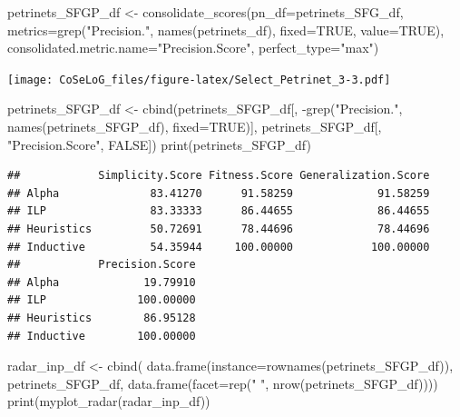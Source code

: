 \documentclass[]{article}
\newenvironment{Shaded}{\begin{snugshade}}{\end{snugshade}}
\newcommand{\KeywordTok}[1]{\textcolor[rgb]{0.94,0.87,0.69}{{#1}}}
\newcommand{\DataTypeTok}[1]{\textcolor[rgb]{0.87,0.87,0.75}{{#1}}}
\newcommand{\StringTok}[1]{\textcolor[rgb]{0.80,0.58,0.58}{{#1}}}
\newcommand{\OtherTok}[1]{\textcolor[rgb]{0.94,0.94,0.56}{{#1}}}
\newcommand{\NormalTok}[1]{\textcolor[rgb]{0.80,0.80,0.80}{{#1}}}
\begin{document}
\begin{Shaded}
\begin{Highlighting}[]
\NormalTok{petrinets_SFGP_df <-}\StringTok{ }\KeywordTok{consolidate_scores}\NormalTok{(}\DataTypeTok{pn_df=}\NormalTok{petrinets_SFG_df, }
        \DataTypeTok{metrics=}\KeywordTok{grep}\NormalTok{(}\StringTok{"Precision."}\NormalTok{, }\KeywordTok{names}\NormalTok{(petrinets_df), }\DataTypeTok{fixed=}\OtherTok{TRUE}\NormalTok{, }\DataTypeTok{value=}\OtherTok{TRUE}\NormalTok{), }
        \DataTypeTok{consolidated.metric.name=}\StringTok{"Precision.Score"}\NormalTok{,}
        \DataTypeTok{perfect_type=}\StringTok{"max"}\NormalTok{)}
\end{Highlighting}
\end{Shaded}

\texttt{[image: CoSeLoG\_files/figure-latex/Select\_Petrinet\_3-3.pdf]}

\begin{Shaded}
\begin{Highlighting}[]
\NormalTok{petrinets_SFGP_df <-}\StringTok{ }\KeywordTok{cbind}\NormalTok{(petrinets_SFGP_df[, }
            \NormalTok{-}\KeywordTok{grep}\NormalTok{(}\StringTok{"Precision."}\NormalTok{, }\KeywordTok{names}\NormalTok{(petrinets_SFGP_df), }\DataTypeTok{fixed=}\OtherTok{TRUE}\NormalTok{)],}
            \NormalTok{petrinets_SFGP_df[, }\StringTok{"Precision.Score"}\NormalTok{, }\OtherTok{FALSE}\NormalTok{])}
\KeywordTok{print}\NormalTok{(petrinets_SFGP_df)}
\end{Highlighting}
\end{Shaded}

\begin{verbatim}
##            Simplicity.Score Fitness.Score Generalization.Score
## Alpha              83.41270      91.58259             91.58259
## ILP                83.33333      86.44655             86.44655
## Heuristics         50.72691      78.44696             78.44696
## Inductive          54.35944     100.00000            100.00000
##            Precision.Score
## Alpha             19.79910
## ILP              100.00000
## Heuristics        86.95128
## Inductive        100.00000
\end{verbatim}

\begin{Shaded}
\begin{Highlighting}[]
\NormalTok{radar_inp_df <-}\StringTok{ }\KeywordTok{cbind}\NormalTok{( }\KeywordTok{data.frame}\NormalTok{(}\DataTypeTok{instance=}\KeywordTok{rownames}\NormalTok{(petrinets_SFGP_df)),}
                       \NormalTok{petrinets_SFGP_df,}
                       \KeywordTok{data.frame}\NormalTok{(}\DataTypeTok{facet=}\KeywordTok{rep}\NormalTok{(}\StringTok{" "}\NormalTok{, }\KeywordTok{nrow}\NormalTok{(petrinets_SFGP_df))))}
\KeywordTok{print}\NormalTok{(}\KeywordTok{myplot_radar}\NormalTok{(radar_inp_df))}
\end{Highlighting}
\end{Shaded}
\end{document}
